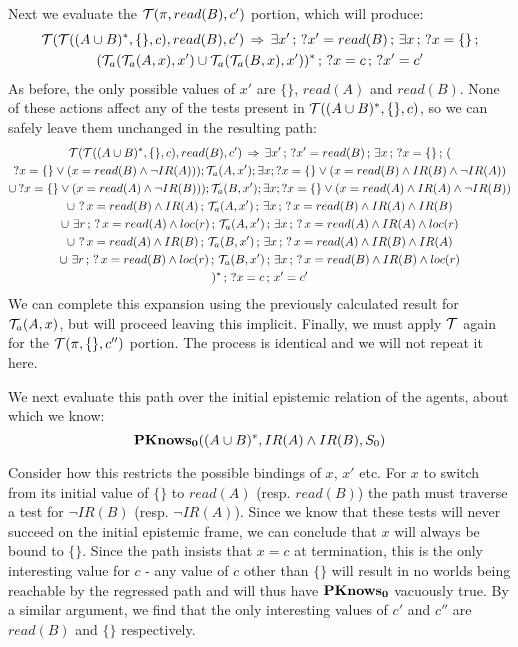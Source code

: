 Next we evaluate the $\mathcal{T}(\pi,read(B),c')$ portion, which will produce:\begin{multline*}
\mathcal{T}(\mathcal{T}((A\cup B)^{*},\{\},c),read(B),c')\,\Rightarrow\,\exists x'\,;\,?x'=read(B)\,;\,\exists x\,;\,?x=\{\}\,;\\
(\mathcal{T}_{a}(\mathcal{T}_{a}(A,x),x')\cup\mathcal{T}_{a}(\mathcal{T}_{a}(B,x),x'))^{*}\,;\,?x=c\,;\,?x'=c'\end{multline*}
 As before, the only possible values of $x'$ are $\{\}$, $read(A)$
and $read(B)$. None of these actions affect any of the tests present
in $\mathcal{T}((A\cup B)^{*},\{\},c)$, so we can safely leave them unchanged
in the resulting path:\begin{multline*}
\mathcal{T}(\mathcal{T}((A\cup B)^{*},\{\},c),read(B),c')\,\Rightarrow\,\exists x'\,;\,?x'=read(B)\,;\,\exists x\,;\,?x=\{\}\,;\,(\\
?x=\{\}\vee(x=read(B)\wedge\neg IR(A)));\mathcal{T}_{a}(A,x');\exists x;?x=\{\}\vee(x=read(B)\wedge IR(B)\wedge\neg IR(A))\\
\cup\,?x=\{\}\vee(x=read(A)\wedge\neg IR(B)));\mathcal{T}_{a}(B,x');\exists x;?x=\{\}\vee(x=read(A)\wedge IR(A)\wedge\neg IR(B))\\
\cup\,\,?\, x=read(B)\wedge IR(A)\,;\,\mathcal{T}_{a}(A,x')\,;\,\exists x\,;\,?\, x=read(B)\wedge IR(A)\wedge IR(B)\\
\cup\,\,\exists r\,;\,?\, x=read(A)\wedge loc(r)\,;\,\mathcal{T}_{a}(A,x')\,;\,\exists x\,;\,?\, x=read(A)\wedge IR(A)\wedge loc(r)\\
\cup\,\,?\, x=read(A)\wedge IR(B)\,;\,\mathcal{T}_{a}(B,x')\,;\,\exists x\,;\,?\, x=read(A)\wedge IR(B)\wedge IR(A)\\
\cup\,\,\exists r\,;\,?\, x=read(B)\wedge loc(r)\,;\,\mathcal{T}_{a}(B,x')\,;\,\exists x\,;\,?\, x=read(B)\wedge IR(B)\wedge loc(r)\\
)^{*}\,;\,?x=c\,;\, x'=c'\end{multline*}
 We can complete this expansion using the previously calculated result
for $\mathcal{T}_{a}(A,x)$, but will proceed leaving this implicit. Finally,
we must apply $\mathcal{T}$ again for the $\mathcal{T}(\pi,\{\},c'')$ portion.
The process is identical and we will not repeat it here.

We next evaluate this path over the initial epistemic relation of
the agents, about which we know:\[
\mathbf{PKnows_{0}}((A\cup B)^{*},IR(A)\wedge IR(B),S_{0})\]


Consider how this restricts the possible bindings of $x$, $x'$ etc.
For $x$ to switch from its initial value of $\{\}$ to $read(A)$
(resp. $read(B)$) the path must traverse a test for $\neg IR(B)$
(resp. $\neg IR(A)$). Since we know that these tests will never succeed
on the initial epistemic frame, we can conclude that $x$ will always
be bound to $\{\}$. Since the path insists that $x=c$ at termination,
this is the only interesting value for $c$ - any value of $c$ other
than $\{\}$ will result in no worlds being reachable by the regressed
path and will thus have $\mathbf{PKnows_{0}}$ vacuously true. By a similar argument,
we find that the only interesting values of $c'$ and $c''$ are $read(B)$
and $\{\}$ respectively.

